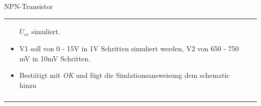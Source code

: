 \begin{frame}[t]{NPN-Transistor}
\begin{spacing}{0.9}
\begin{tiny}
\begin{table}[h!]
\begin{tabular}{p{3cm} p{7cm}}
\begin{minipage}{.7\textwidth}
\begin{itemize}
            $U_{ce}$ simuliert. 
            \item V1 soll von 0 - 15V in 1V Schritten simuliert werden, V2 von 650 - 750 mV in 10mV Schritten.
            \item Bestätigt mit \textit{OK} und fügt die Simlationsansweisung dem schematic hinzu
          \end{itemize}
          \end{minipage} 
          \\
           & \\
           \hline
        \end{tabular}
      
      \end{table}
      
      \end{tiny} \end{spacing}
      
       \end{frame}




